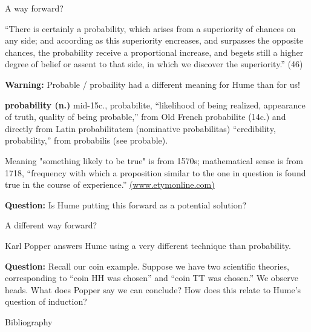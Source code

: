 \documentclass[8pt]{beamer}\usepackage[]{graphicx}\usepackage[]{color}
\begin{document}
\begin{frame}{A way forward?}

\begin{addmargin}[2em]{2em}%
    ``There is certainly a probability, which arises from a superiority
    of chances on any side; and acoording as this superiority encreases,
    and surpasses the opposite chances, the probability receive a proportional
    increase, and begets still a higher degree of belief or assent to that side,
    in which we discover the superiority.'' (46)
\end{addmargin}

\pause
\textbf{Warning:}
Probable / probaility had a different meaning for Hume than for us!

\textbf{probability (n.)} mid-15c., probabilite, ``likelihood of being realized,
appearance of truth, quality of being probable,'' from Old French probabilite
(14c.) and directly from Latin probabilitatem (nominative probabilitas)
``credibility, probability,'' from probabilis (see probable).

Meaning "something likely to be true" is from 1570s; mathematical sense is from
1718, ``frequency with which a proposition similar to the one in question is
found true in the course of experience.''
\href{https://www.etymonline.com/word/probability}{(www.etymonline.com)}

\pause

\textbf{Question:} Is Hume putting this forward as a potential solution?

\end{frame}



\begin{frame}{A different way forward?}

Karl Popper answers Hume using a very different technique than
probability.

\setminipage{}

\textbf{Question:} Recall our coin example.  Suppose we have two
scientific theories, corresponding to ``coin HH was chosen''
and ``coin TT was chosen.''  We observe heads.  What does Popper
say we can conclude?  How does this relate to Hume's question of
induction?


\end{frame}


\begin{frame}{Bibliography}
\printbibliography{}
\end{frame}
\end{document}
